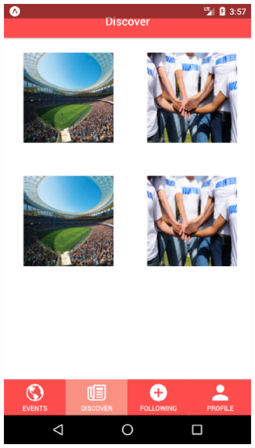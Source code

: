 \documentclass[letterpaper, 10pt,titlepage]{article}
\begin{document}
\newpage
\includegraphics{Discover_Screen.eps}
\newpage
\end{document}
